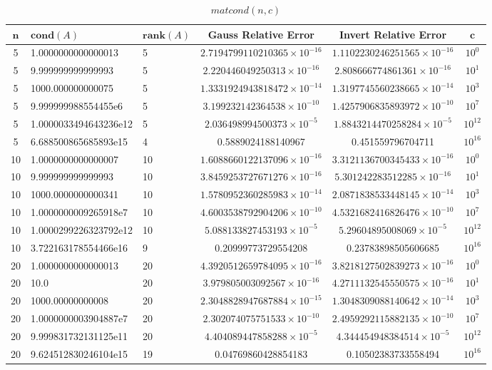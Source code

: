 \documentclass[10pt,a4paper, polish]{article}
\begin{document}
\begin{table}[H]
\centering
\caption{$matcond(n,c)$}
\begin{tabular}{|c|p{3.4cm}|p{1cm}|c|c|c|}
\hline
$\textbf{n}$ & $\textbf{cond}(A)$ & $\textbf{rank}(A)$ & \textbf{Gauss Relative Error} & \textbf{Invert Relative Error} & $\textbf{c}$ \\
\hline
5 & 1.0000000000000013 & 5 & $2.7194799110210365 \times 10^{-16}$ & $1.1102230246251565 \times 10^{-16}$ & $10^0$ \\
\hline
5 & 9.999999999999993 & 5 & $2.220446049250313 \times 10^{-16}$ & $2.808666774861361 \times 10^{-16}$ & $10^1$ \\
\hline
5 & 1000.000000000075 & 5 & $1.3331924943818472 \times 10^{-14}$ & $1.3197745560238665 \times 10^{-14}$ & $10^3$ \\
\hline
5 & 9.999999988554455e6 & 5 & $3.199232142364538 \times 10^{-10}$ & $1.4257906835893972 \times 10^{-10}$ & $10^7$ \\
\hline
5 & 1.0000033494643236e12 & 5 & $2.036498994500373 \times 10^{-5}$ & $1.8843214470258284 \times 10^{-5}$ & $10^{12}$ \\
\hline
5 & 6.688500865685893e15 & 4 & 0.5889024188140967 & 0.451559796704711 & $10^{16}$ \\
\hline
10 & 1.0000000000000007 & 10 & $1.6088660122137096 \times 10^{-16}$ & $3.3121136700345433 \times 10^{-16}$ & $10^0$ \\
\hline
10 & 9.999999999999993 & 10 & $3.8459253727671276 \times 10^{-16}$ & $5.301242283512285 \times 10^{-16}$ & $10^1$ \\
\hline
10 & 1000.0000000000341 & 10 & $1.5780952360285983 \times 10^{-14}$ & $2.0871838533448145 \times 10^{-14}$ & $10^3$ \\
\hline
10 & 1.0000000009265918e7 & 10 & $4.6003538792904206 \times 10^{-10}$ & $4.5321682416826476 \times 10^{-10}$ & $10^7$ \\
\hline
10 & 1.0000299226323792e12 & 10 & $5.088133827453193 \times 10^{-5}$ & $5.29604895008069 \times 10^{-5}$ & $10^{12}$ \\
\hline
10 & 3.722163178554466e16 & 9 & 0.20999773729554208 & 0.23783898505606685 & $10^{16}$ \\
\hline
20 & 1.0000000000000013 & 20 & $4.3920512659784095 \times 10^{-16}$ & $3.8218127502839273 \times 10^{-16}$ & $10^0$ \\
\hline
20 & 10.0 & 20 & $3.979805003092567 \times 10^{-16}$ & $4.2711132545550575 \times 10^{-16}$ & $10^1$ \\
\hline
20 & 1000.00000000008 & 20 & $2.3048828947687884 \times 10^{-15}$ & $1.3048309088140642 \times 10^{-14}$ & $10^3$ \\
\hline
20 & 1.0000000003904887e7 & 20 & $2.302074075751533 \times 10^{-10}$ & $2.4959292115882135 \times 10^{-10}$ & $10^7$ \\
\hline
20 & 9.999831732131125e11 & 20 & $4.404089447858288 \times 10^{-5}$ & $4.344454948384514 \times 10^{-5}$ & $10^{12}$ \\
\hline
20 & 9.624512830246104e15 & 19 & 0.04769860428854183 & 0.10502383733558494 & $10^{16}$ \\
\hline
\end{tabular}
\end{table}
\end{document}
